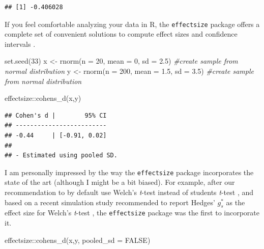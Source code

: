 \documentclass[
  oneside]{book}
\newenvironment{Shaded}{\begin{snugshade}}{\end{snugshade}}
\newcommand{\AttributeTok}[1]{\textcolor[rgb]{0.77,0.63,0.00}{#1}}
\newcommand{\CommentTok}[1]{\textcolor[rgb]{0.56,0.35,0.01}{\textit{#1}}}
\newcommand{\ConstantTok}[1]{\textcolor[rgb]{0.00,0.00,0.00}{#1}}
\newcommand{\DecValTok}[1]{\textcolor[rgb]{0.00,0.00,0.81}{#1}}
\newcommand{\FloatTok}[1]{\textcolor[rgb]{0.00,0.00,0.81}{#1}}
\newcommand{\FunctionTok}[1]{\textcolor[rgb]{0.00,0.00,0.00}{#1}}
\newcommand{\NormalTok}[1]{#1}
\newcommand{\OtherTok}[1]{\textcolor[rgb]{0.56,0.35,0.01}{#1}}
\newcommand{\SpecialCharTok}[1]{\textcolor[rgb]{0.00,0.00,0.00}{#1}}
\begin{document}
\begin{verbatim}
## [1] -0.406028
\end{verbatim}

If you feel comfortable analyzing your data in R, the \texttt{effectsize} package offers a complete set of convenient solutions to compute effect sizes and confidence intervals \citep{ben-shachar_effectsize_2020}.

\begin{Shaded}
\begin{Highlighting}[]
\FunctionTok{set.seed}\NormalTok{(}\DecValTok{33}\NormalTok{)}
\NormalTok{x }\OtherTok{\textless{}{-}} \FunctionTok{rnorm}\NormalTok{(}\AttributeTok{n =} \DecValTok{20}\NormalTok{, }\AttributeTok{mean =} \DecValTok{0}\NormalTok{, }\AttributeTok{sd =} \FloatTok{2.5}\NormalTok{) }\CommentTok{\#create sample from normal distribution}
\NormalTok{y }\OtherTok{\textless{}{-}} \FunctionTok{rnorm}\NormalTok{(}\AttributeTok{n =} \DecValTok{200}\NormalTok{, }\AttributeTok{mean =} \FloatTok{1.5}\NormalTok{, }\AttributeTok{sd =} \FloatTok{3.5}\NormalTok{) }\CommentTok{\#create sample from normal distribution}

\NormalTok{effectsize}\SpecialCharTok{::}\FunctionTok{cohens\_d}\NormalTok{(x,y)}
\end{Highlighting}
\end{Shaded}

\begin{verbatim}
## Cohen's d |        95% CI
## -------------------------
## -0.44     | [-0.91, 0.02]
## 
## - Estimated using pooled SD.
\end{verbatim}

I am personally impressed by the way the \texttt{effectsize} package incorporates the state of the art (although I might be a bit biased). For example, after our recommendation to by default use Welch's \emph{t}-test instead of students \emph{t}-test \citep{delacre_why_2017}, and based on a recent simulation study recommended to report Hedges' \(g_s^*\) as the effect size for Welch's \emph{t}-test \citep{delacre_why_2021}, the \texttt{effectsize} package was the first to incorporate it.

\begin{Shaded}
\begin{Highlighting}[]
\NormalTok{effectsize}\SpecialCharTok{::}\FunctionTok{cohens\_d}\NormalTok{(x,y, }\AttributeTok{pooled\_sd =} \ConstantTok{FALSE}\NormalTok{)}
\end{Highlighting}
\end{Shaded}
\end{document}
